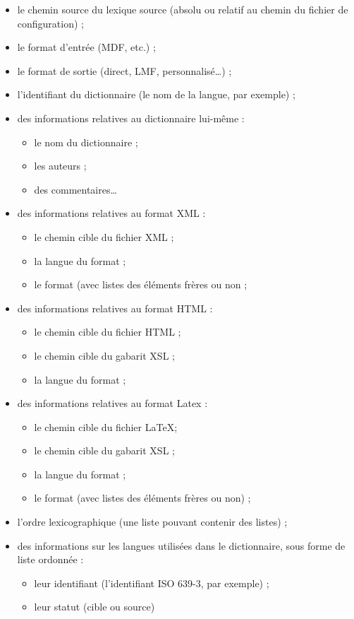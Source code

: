 \documentclass[10pt]{report}
\begin{document}
\begin{itemize}
	\item le chemin source du lexique source (absolu ou relatif au chemin du fichier de configuration) ;
	\item le format d’entrée (MDF, etc.) ;
	\item le format de sortie (direct, LMF, personnalisé…) ;
	\item l’identifiant du dictionnaire (le nom de la langue, par exemple) ;
	\item des informations relatives au dictionnaire lui-même :
	\begin{itemize}
    \item le nom du dictionnaire ;
    \item les auteurs ;
    \item des commentaires…
	\end{itemize}
	\item des informations relatives au format XML :
	\begin{itemize}
    \item le chemin cible du fichier XML ;
    \item la langue du format ;
    \item le format (avec listes des éléments frères ou non ;
	\end{itemize}
	\item des informations relatives au format HTML :
	\begin{itemize}
    \item le chemin cible du fichier HTML ;
    \item le chemin cible du gabarit XSL ;
    \item la langue du format ;
	\end{itemize}
	\item des informations relatives au format Latex :
	\begin{itemize}
    \item le chemin cible du fichier \LaTeX ;
    \item le chemin cible du gabarit XSL ;
    \item la langue du format ;
    \item le format (avec listes des éléments frères ou non) ;
	\end{itemize}
	\item l’ordre lexicographique (une liste pouvant contenir des listes) ;
	\item des informations sur les langues utilisées dans le dictionnaire, sous forme de liste ordonnée :
	\begin{itemize}
    \item leur identifiant (l’identifiant ISO 639-3, par exemple) ;
    \item leur statut (cible ou source)
	\end{itemize}
\end{itemize}
\end{document}
